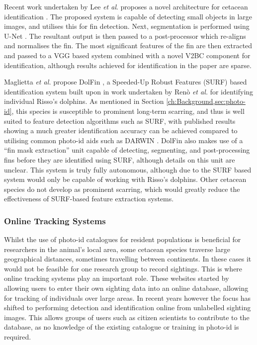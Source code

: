 Recent work undertaken by Lee \textit{et al}. proposes a novel architecture for cetacean identification \cite{lee_backbone_2020}. The proposed system is capable of detecting small objects in large images, and utilises this for fin detection. Next, segmentation is performed using U-Net \cite{ronneberger_u-net_2015}. The resultant output is then passed to a post-processor which re-aligns and normalises the fin. The most significant features of the fin are then extracted and passed to a VGG based system \cite{simonyan_very_2015} combined with a novel V2BC component for identification, although results achieved for identification in the paper are sparse.

Maglietta \textit{et al.} propose DolFin \cite{maglietta_dolfin_2018}, a Speeded-Up Robust Features (SURF) based identification system \cite{bay_speeded-up_2008} built upon in work undertaken by Renò \textit{et al.} \cite{reno_sift-based_2019} for identifying individual Risso's dolphins. As mentioned in Section \ref{ch:Background,sec:photo-id}, this species is susceptible to prominent long-term scarring, and thus is well suited to feature detection algorithms such as SURF, with published results showing a much greater identification accuracy can be achieved compared to utilising common photo-id aids such as DARWIN \cite{hale_unsupervised_2012}. DolFin also makes use of a ``fin mask extraction'' unit capable of detecting, segmenting, and post-processing fins before they are identified using SURF, although details on this unit are unclear. This system is truly fully autonomous, although due to the SURF based system would only be capable of working with Risso's dolphins. Other cetacean species do not develop as prominent scarring, which would greatly reduce the effectiveness of SURF-based feature extraction systems. 

\subsubsection{Online Tracking Systems}\label{ch:Background,sec:conTech,sub:photoIDAides,subsub:OnlineTracking}

Whilst the use of photo-id catalogues for resident populations is beneficial for researchers in the animal's local area, some cetacean species traverse large geographical distances, sometimes travelling between continents. In these cases it would not be feasible for one research group to record sightings. This is where online tracking systems play an important role. These websites started by allowing users to enter their own sighting data into an online database, allowing for tracking of individuals over large areas. In recent years however the focus has shifted to performing detection and identification online from unlabelled sighting images. This allows groups of users such as citizen scientists to contribute to the database, as no knowledge of the existing catalogue or training in photo-id is required.

